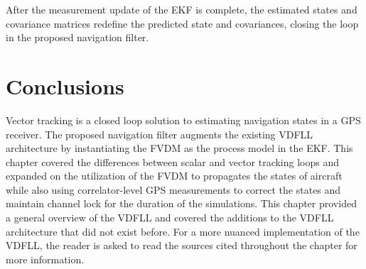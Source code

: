 After the measurement update of the EKF is complete, the estimated states and covariance matrices redefine the predicted state and covariances, closing the loop in the proposed navigation filter.

\section{\textbf{Conclusions}}
Vector tracking is a closed loop solution to estimating navigation states in a GPS receiver. The proposed navigation filter augments the existing VDFLL architecture by instantiating the FVDM as the process model in the EKF\@. This chapter covered the differences between scalar and vector tracking loops and expanded on the utilization of the FVDM to propagates the states of aircraft while also using correlator-level GPS measurements to correct the states and maintain channel lock for the duration of the simulations. This chapter provided a general overview of the VDFLL and covered the additions to the VDFLL architecture that did not exist before. For a more nuanced implementation of the VDFLL, the reader is asked to read the sources cited throughout the chapter for more information.